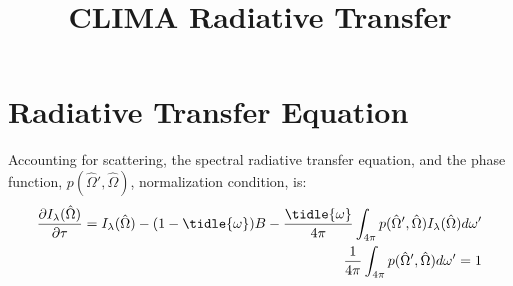 \documentclass{report}
\title{CLIMA Radiative Transfer}
\author{ }
\newcommand{\PD}{\partial}
\newcommand{\IL}{I_{\lambda}}
\newcommand{\HOM}{\hat{\Omega}}
\newcommand{\tom}{\tidle{\omega}}
\begin{document}
\maketitle
\tableofcontents

\chapter{Radiative Transfer Equation}
Accounting for scattering, the spectral radiative transfer equation, and the phase function, $p(\HOM',\HOM)$, normalization condition, is:
\begin{equation}\begin{aligned}
\frac{\PD \IL(\HOM)}{\PD \tau} = \IL(\HOM) - (1 - \tom) B - \frac{\tom}{4 \pi} \int_{4 \pi} p(\HOM',\HOM) \IL(\HOM) d \omega' \\
\frac{1}{4\pi} \int_{4\pi} p(\HOM',\HOM) d\omega'=1
\end{aligned}\end{equation}




\end{document}
